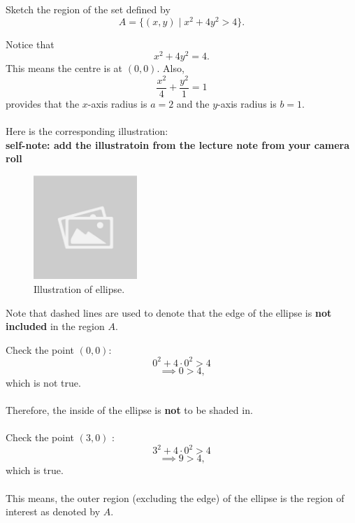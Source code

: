 \documentclass{article}
\begin{document}
\begin{examplebox}
Sketch the region of the set defined by
\[
    A = \{ (x, y) \mid x^2 + 4y^2 > 4 \} \text{.}
\]
\begin{solutionbox}
    Notice that
    \[
        x^2 + 4y^2 = 4 \text{.}
    \]
    This means the centre is at \( (0, 0) \).
    Also,
    \[
        \dfrac{x^2}{4} + \dfrac{y^2}{1} = 1
    \]
    provides that the \( x \)-axis radius is \( a = 2 \) and the \( y \)-axis radius is \( b = 1 \). \\
    \\
    Here is the corresponding illustration:
    \\\textbf{self-note: add the illustratoin from the lecture note from your camera roll}
    \begin{figure}[H]
        \centering
        \includegraphics[width=0.35\textwidth]{sample_image.jpg}
        \caption{Illustration of ellipse.}
        \label{fig:sample_image}
    \end{figure}
    \begin{notebox}
    Note that dashed lines are used to denote that the edge of the ellipse is \textbf{not included} in the region \( A \).
    \end{notebox}
    Check the point \( (0, 0) \):
    \[
        0^2 + 4 \cdot 0^2 > 4
    \]
    \[
        \implies 0 > 4 \text{,}
    \]
    which is not true. \\
    \\
    Therefore, the inside of the ellipse is \textbf{not} to be shaded in. \\
    \\
    Check the point \( (3, 0) \) :
    \[
        3^2 + 4 \cdot 0^2 > 4
    \]
    \[
        \implies 9 > 4 \text{,}
    \]
    which is true. \\
    \\
    This means, the outer region (excluding the edge) of the ellipse is the region of interest as denoted by \( A \).
\end{solutionbox}
\end{examplebox}
\end{document}
